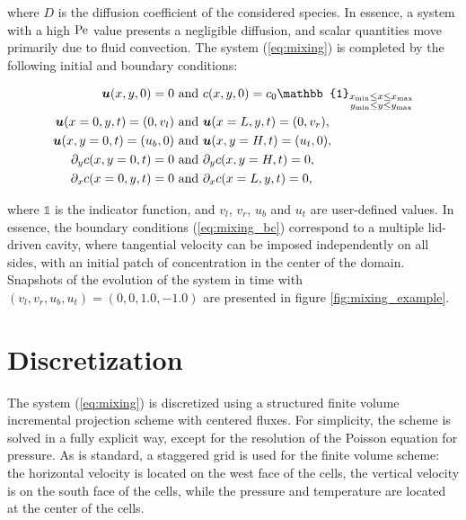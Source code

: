 where $D$ is the diffusion coefficient of the considered species. In essence, a system with a high $\text{Pe}$ value presents a negligible diffusion, and scalar quantities move primarily due to fluid convection. The system (\ref{eq:mixing}) is completed by the following initial and boundary conditions:

\begin{equation}
\label{eq:mixing_bc}
\begin{split}
	\V{u}(x,y,0)	= 0 &\text{ and } c(x,y,0)	= c_0 \mathbb{1}_{\substack{ {x_\text{min} \leq x \leq x_\text{max}}\\ {y_\text{min} \leq y \leq y_\text{max}} }} \\
	\V{u}(x=0,y,t)	= (0, v_l) &\text{ and } \V{u}(x=L,y,t) = (0, v_r), \\
	\V{u}(x,y=0,t)	= (u_b, 0) &\text{ and } \V{u}(x,y=H,t) = (u_t, 0), \\
	\partial_y c(x,y=0,t) 	= 0 &\text{ and } \partial_y c(x,y=H,t) = 0, \\
	\partial_x c(x=0,y,t) = 0 &\text{ and } \partial_x c(x=L,y,t) = 0,
\end{split}
\end{equation}

where $\mathbb{1}$ is the indicator function, and $v_l$, $v_r$, $u_b$ and $u_t$ are user-defined values. In essence, the boundary conditions (\ref{eq:mixing_bc}) correspond to a multiple lid-driven cavity, where tangential velocity can be imposed independently on all sides, with an initial patch of concentration in the center of the domain.  Snapshots of the evolution of the system in time with $(v_l, v_r, u_b, u_t) = (0, 0, 1.0, -1.0)$ are presented in figure \ref{fig:mixing_example}.



\section{Discretization}

The system (\ref{eq:mixing}) is discretized using a structured finite volume incremental projection scheme with centered fluxes. For simplicity, the scheme is solved in a fully explicit way, except for the resolution of the Poisson equation for pressure. As is standard, a staggered grid is used for the finite volume scheme: the horizontal velocity is located on the west face of the cells, the vertical velocity is on the south face of the cells, while the pressure and temperature are located at the center of the cells.

